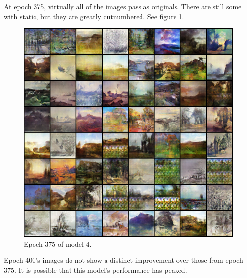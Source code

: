 \documentclass[11pt,letterpaper]{article}
\begin{document}
				At epoch 375, virtually all of the images pass as originals.
				There are still some with static, but they are greatly outnumbered.
				See figure \ref{fig:wa64:epoch375generator}.
				\begin{figure}
					\centering
					\includegraphics[width=1.0\linewidth]{results/model4/epoch375_generator}
					\caption{Epoch 375 of model 4.}
					\label{fig:wa64:epoch375generator}
				\end{figure}

				Epoch 400's images do not show a distinct improvement over those from epoch 375.
				It is possible that this model's performance has peaked.
\end{document}
